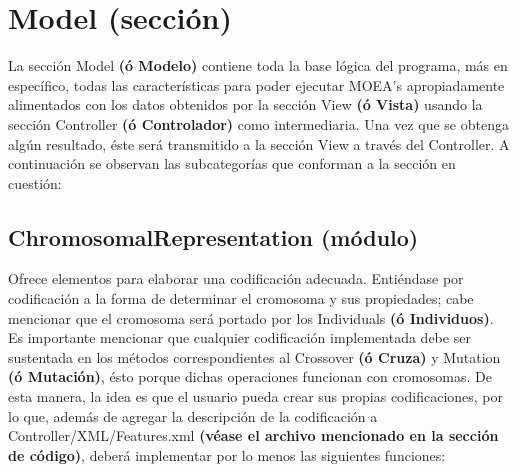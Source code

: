 \documentclass[class=report, crop=false]{standalone}
\begin{document}
\section{Model (sección)}
\label{sec:a_2}
La sección Model \textbf{(ó Modelo)} contiene toda la base lógica del 
programa, más en específico, todas las características para poder ejecutar 
MOEA's apropiadamente alimentados con los datos obtenidos por la sección 
View \textbf{(ó Vista)} usando la sección Controller \textbf{(ó Controlador)} 
como intermediaria.\break
Una vez que se obtenga algún resultado, éste será transmitido a la sección View 
a través del Controller.\medskip\break
A continuación se observan las subcategorías que conforman a la sección 
en cuestión:

\subsection{ChromosomalRepresentation (módulo)}
\label{sec:a_2_1}
Ofrece elementos para elaborar una codificación adecuada.\break
Entiéndase por codificación a la forma de determinar el 
cromosoma y sus propiedades; cabe mencionar que el cromosoma será portado 
por los Individuals \textbf{(ó Individuos)}.\medskip\break
Es importante mencionar que cualquier codificación implementada debe ser 
sustentada en los métodos correspondientes al Crossover \textbf{(ó Cruza)} y 
Mutation \textbf{(ó Mutación)}, ésto porque dichas operaciones funcionan con 
cromosomas.\medskip\break
De esta manera, la idea es que el usuario pueda crear sus propias codificaciones,
por lo que, además de agregar la descripción de la codificación a 
Controller/XML/Features.xml \textbf{(véase el archivo mencionado en la sección de código)}, 
deberá implementar por lo menos las siguientes funciones:
\end{document}
